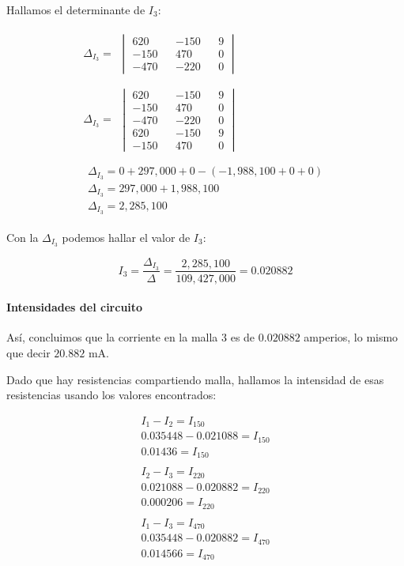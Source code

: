 \documentclass[conference]{IEEEtran}
\begin{document}
Hallamos el determinante de $I_3$:

\begin{align*}
  \Delta_{I_3} =
  \begin{split}
    \begin{vmatrix}
       620 && -150 && 9 \\
      -150 &&  470 && 0 \\
      -470 && -220 && 0
    \end{vmatrix}
  \end{split} \\ \\
  \Delta_{I_3} =
  \begin{split}
    \begin{vmatrix}
       620 && -150 && 9 \\
      -150 &&  470 && 0 \\
      -470 && -220 && 0 \\
       620 && -150 && 9 \\
      -150 &&  470 && 0
    \end{vmatrix}
  \end{split} \\ \\
  \begin{split}
    \Delta_{I_3} = 0 + 297,000 + 0 - (-1,988,100 + 0 + 0) \\
    \Delta_{I_3} = 297,000 + 1,988,100 \\
    \Delta_{I_3} = 2,285,100
  \end{split}
\end{align*}

Con la $\Delta_{I_3}$ podemos hallar el valor de $I_3$:

\begin{equation*}
  I_3 = \frac{\Delta_{I_3}}{\Delta} = \frac{2,285,100}{109,427,000}  = 0.020882
\end{equation*}

\paragraph{Intensidades del circuito}

Así, concluimos que la corriente en la malla 3 es de $0.020882$ amperios, lo mismo 
que decir $20.882$ mA.

Dado que hay resistencias compartiendo malla, hallamos la intensidad de esas 
resistencias usando los valores encontrados:

\begin{align*}
  I_1 - I_2 = I_{150} \\
  0.035448 - 0.021088 = I_{150} \\
  0.01436 = I_{150} \\ \\
  I_2 - I_3 = I_{220} \\
  0.021088 - 0.020882 = I_{220} \\
  0.000206 = I_{220} \\ \\
  I_1 - I_3 = I_{470} \\
  0.035448 - 0.020882 = I_{470} \\
  0.014566 = I_{470}
\end{align*}
\end{document}
